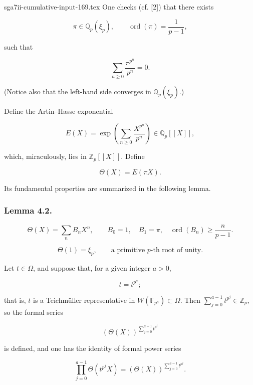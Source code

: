 \begin{filecontents*}{sga7ii-cumulative-input-169.tex}
One checks (cf. [2]) that there exists

\begin{equation}\tag{4.1.4}
\pi\in\mathbb Q_p(\xi_p),\qquad
\operatorname{ord}(\pi)=\frac1{p-1},
\end{equation}

such that

\begin{equation}\tag{4.1.5}
\sum_{n\geq0}\frac{\pi^{p^n}}{p^n}=0.
\end{equation}

(Notice also that the left-hand side converges in $\mathbb Q_p(\xi_p)$.)

Define the Artin--Hasse exponential

\begin{equation}\tag{4.1.6}
E(X)=\exp\!\left(\sum_{n\geq0}\frac{X^{p^n}}{p^n}\right)
\in\mathbb Q_p[[X]],
\end{equation}

which, miraculously, lies in $\mathbb Z_p[[X]]$. Define

\begin{equation}\tag{4.1.7}
\Theta(X)=E(\pi X).
\end{equation}

Its fundamental properties are summarized in the following lemma.

\subsubsection*{Lemma 4.2.}

\begin{equation}\tag{4.2.1}
\Theta(X)=\sum_n B_n X^n,\qquad B_0=1,\quad B_1=\pi,\quad
\operatorname{ord}(B_n)\geq\frac n{p-1}.
\end{equation}

\begin{equation}\tag{4.2.2}
\Theta(1)=\xi_p,\qquad\text{a primitive $p$-th root of unity.}
\end{equation}

Let $t\in\Omega$, and suppose that, for a given integer $a>0$,

\begin{equation}\tag{4.2.3}
t=t^{p^a};
\end{equation}

that is, $t$ is a Teichmüller representative in
$W(\mathbb F_{p^a})\subset\Omega$. Then
$\sum_{j=0}^{a-1}t^{p^j}\in\mathbb Z_p$, so the formal series

\[
(\Theta(X))^{\sum_{j=0}^{a-1}t^{p^j}}
\]

is defined, and one has the identity of formal power series

\begin{equation}\tag{4.2.3.1}
\prod_{j=0}^{a-1}\Theta(t^{p^j}X)
=(\Theta(X))^{\sum_{j=0}^{a-1}t^{p^j}}.
\end{equation}
\end{filecontents*}
